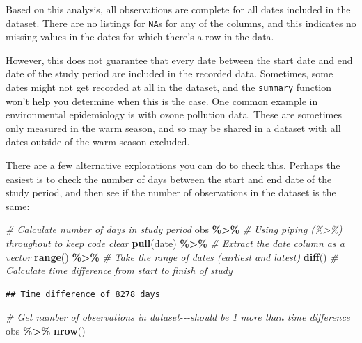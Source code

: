\documentclass[
]{book}
\newenvironment{Shaded}{\begin{snugshade}}{\end{snugshade}}
\newcommand{\CommentTok}[1]{\textcolor[rgb]{0.56,0.35,0.01}{\textit{#1}}}
\newcommand{\FunctionTok}[1]{\textcolor[rgb]{0.13,0.29,0.53}{\textbf{#1}}}
\newcommand{\NormalTok}[1]{#1}
\newcommand{\SpecialCharTok}[1]{\textcolor[rgb]{0.81,0.36,0.00}{\textbf{#1}}}
\begin{document}
Based on this analysis, all observations are complete for all dates included
in the dataset. There are no listings for \texttt{NA}s for any of the columns, and
this indicates no missing values in the dates for which there's a row in the data.

However, this does not guarantee that every date between the start date and
end date of the study period are included in the recorded data. Sometimes,
some dates might not get recorded at all in the dataset, and the \texttt{summary}
function won't help you determine when this is the case. One common example in
environmental epidemiology is with ozone pollution data. These are sometimes
only measured in the warm season, and so may be shared in a dataset with all
dates outside of the warm season excluded.

There are a few alternative explorations you can do to check this. Perhaps the
easiest is to check
the number of days between the start and end date of the study period, and
then see if the number of observations in the dataset is the same:

\begin{Shaded}
\begin{Highlighting}[]
\CommentTok{\# Calculate number of days in study period}
\NormalTok{obs }\SpecialCharTok{\%\textgreater{}\%}            \CommentTok{\# Using piping (\%\textgreater{}\%) throughout to keep code clear}
  \FunctionTok{pull}\NormalTok{(date) }\SpecialCharTok{\%\textgreater{}\%}   \CommentTok{\# Extract the \textasciigrave{}date\textasciigrave{} column as a vector}
  \FunctionTok{range}\NormalTok{() }\SpecialCharTok{\%\textgreater{}\%}      \CommentTok{\# Take the range of dates (earliest and latest)}
  \FunctionTok{diff}\NormalTok{()           }\CommentTok{\# Calculate time difference from start to finish of study }
\end{Highlighting}
\end{Shaded}

\begin{verbatim}
## Time difference of 8278 days
\end{verbatim}

\begin{Shaded}
\begin{Highlighting}[]
\CommentTok{\# Get number of observations in dataset{-}{-}{-}should be 1 more than time difference}
\NormalTok{obs }\SpecialCharTok{\%\textgreater{}\%} 
  \FunctionTok{nrow}\NormalTok{()}
\end{Highlighting}
\end{Shaded}
\end{document}
